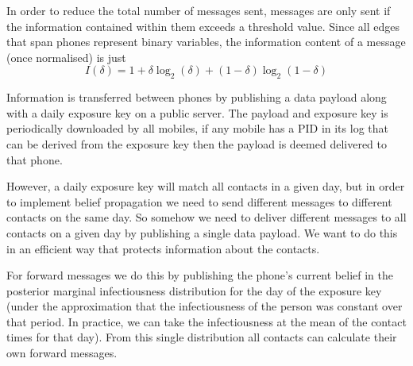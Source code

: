 \documentclass{article}
\begin{document}
In order to reduce the total number of messages sent, messages are only sent if the information contained within them exceeds a threshold value. Since all edges that span phones represent binary variables, the information content of a message (once normalised) is just
\[
I(\delta) = 1 + \delta\log_2(\delta) + (1-\delta)\log_2(1-\delta)
\]

Information is transferred between phones by publishing a data payload along with a daily exposure key on a public server. The payload and exposure key is periodically downloaded by all mobiles, if any mobile has a PID in its log that can be derived from the exposure key then the payload is deemed delivered to that phone.

However, a daily exposure key will match all contacts in a given day, but in order to implement belief propagation we need to send different messages to different contacts on the same day. So somehow we need to deliver different messages to all contacts on a given day by publishing a single data payload. We want to do this in an efficient way that protects information about the contacts.

For forward messages we do this by publishing the phone's current belief in the posterior marginal infectiousness distribution for the day of the exposure key (under the approximation that the infectiousness of the person was constant over that period. In practice, we can take the infectiousness at the mean of the contact times for that day). From this single distribution all contacts can calculate their own forward messages.
\end{document}
